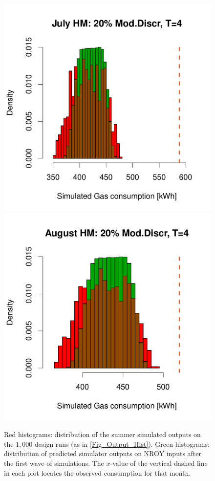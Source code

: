 \documentclass[a4paper, 12pt]{article}
\begin{document}
\begin{figure}
 \includegraphics[width=\scale]{Simulation_histograms/HM_Jun-Aug/July_HM_20MD}
 \includegraphics[width=\scale]{Simulation_histograms/HM_Jun-Aug/August_HM_20MD}\\ 
 \caption{Red histograms: distribution of the summer simulated outputs on the $1,000$ design runs (as in \autoref{Fig_Output_Hist}).
 Green histograms: distribution of predicted simulator outputs on NROY inputs after the first wave of simulations.
 The $x$-value of the vertical dashed line in each plot locates the observed consumption for that month.}
 \label{Fig_Summer}
\end{figure}
\end{document}
